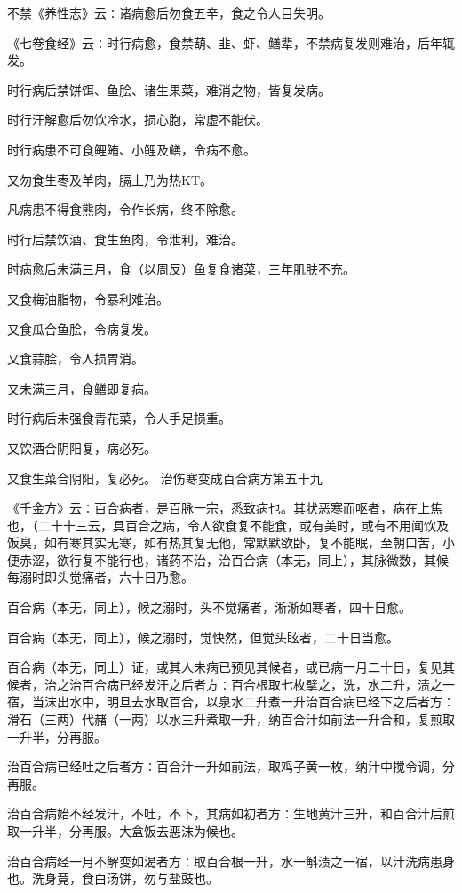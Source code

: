 \documentclass[a4paper,12pt,UTF8,twoside]{ctexbook}
\begin{document}
不禁《养性志》云∶诸病愈后勿食五辛，食之令人目失明。

《七卷食经》云∶时行病愈，食禁葫、韭、虾、鳝辈，不禁病复发则难治，后年辄发。

时行病后禁饼饵、鱼脍、诸生果菜，难消之物，皆复发病。

时行汗解愈后勿饮冷水，损心胞，常虚不能伏。

时行病患不可食鲤鲔、小鲤及鳝，令病不愈。

又勿食生枣及羊肉，膈上乃为热KT。

凡病患不得食熊肉，令作长病，终不除愈。

时行后禁饮酒、食生鱼肉，令泄利，难治。

时病愈后未满三月，食（以周反）鱼复食诸菜，三年肌肤不充。

又食梅油脂物，令暴利难治。

又食瓜合鱼脍，令病复发。

又食蒜脍，令人损胃消。

又未满三月，食鳝即复病。

时行病后未强食青花菜，令人手足损重。

又饮酒合阴阳复，病必死。

又食生菜合阴阳，复必死。
治伤寒变成百合病方第五十九

《千金方》云∶百合病者，是百脉一宗，悉致病也。其状恶寒而呕者，病在上焦也，（二十十三云，具百合之病，令人欲食复不能食，或有美时，或有不用闻饮及饭臭，如有寒其实无寒，如有热其复无他，常默默欲卧，复不能眠，至朝口苦，小便赤涩，欲行复不能行也，诸药不治，治百合病（本无，同上），其脉微数，其候每溺时即头觉痛者，六十日乃愈。

百合病（本无，同上），候之溺时，头不觉痛者，淅淅如寒者，四十日愈。

百合病（本无，同上），候之溺时，觉快然，但觉头眩者，二十日当愈。

百合病（本无，同上）证，或其人未病已预见其候者，或已病一月二十日，复见其候者，治之治百合病已经发汗之后者方∶百合根取七枚擘之，洗，水二升，渍之一宿，当沫出水中，明旦去水取百合，以泉水二升煮一升治百合病已经下之后者方∶滑石（三两）代赭（一两）以水三升煮取一升，纳百合汁如前法一升合和，复煎取一升半，分再服。

治百合病已经吐之后者方∶百合汁一升如前法，取鸡子黄一枚，纳汁中搅令调，分再服。

治百合病始不经发汗，不吐，不下，其病如初者方∶生地黄汁三升，和百合汁后煎取一升半，分再服。大盒饭去恶沫为候也。

治百合病经一月不解变如渴者方∶取百合根一升，水一斛渍之一宿，以汁洗病患身也。洗身竟，食白汤饼，勿与盐豉也。
\end{document}
